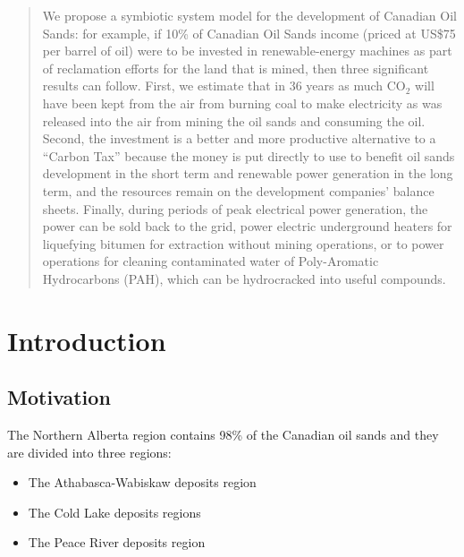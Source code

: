 \documentclass[11pt]{article}
\begin{document}
\maketitle



\begin{abstract}
We propose a symbiotic system model for the development of Canadian Oil Sands: for example, if 10\% of Canadian Oil Sands income (priced at US\$75 per barrel of oil) were to be invested in renewable-energy machines as part of reclamation efforts for the land that is mined, then three significant results can follow. First, we estimate that in 36 years as much CO$_2$ will have been kept from the air from burning coal to make electricity as was released into the air from mining the oil sands and consuming the oil. Second, the investment is a better and more productive alternative to a ``Carbon Tax'' because the money is put directly to use to benefit oil sands development in the short term and renewable power generation in the long term, and the resources remain on the development companies’ balance sheets. Finally, during periods of peak electrical power generation, the power can be sold back to the grid, power electric underground heaters for liquefying bitumen for extraction without mining operations, or to power operations for cleaning contaminated water of Poly-Aromatic Hydrocarbons (PAH), which can be hydrocracked into useful compounds.
\end{abstract}


\section{Introduction}

\subsection{Motivation}

The Northern Alberta region contains 98\% of the Canadian oil sands and they are divided into three regions:
\begin{itemize}
\item The Athabasca-Wabiskaw deposits region
\item The Cold Lake deposits regions 
\item The Peace River deposits region
\end{itemize}
\end{document}
